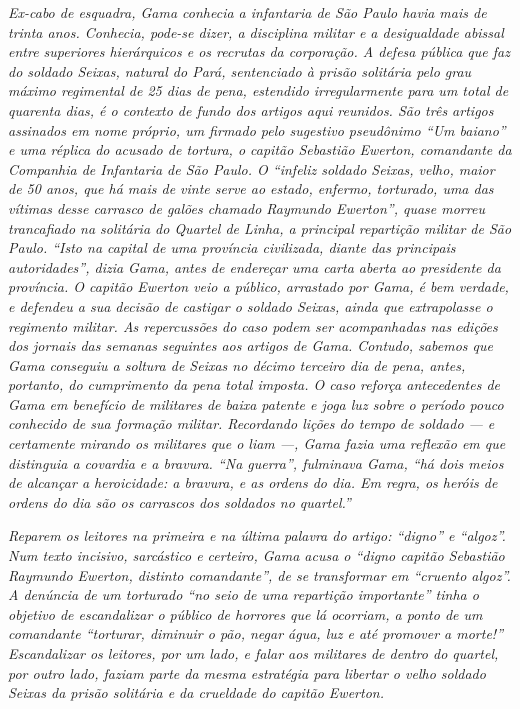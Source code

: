 \begin{didas}
\emph{Ex-cabo de esquadra, Gama conhecia a infantaria de São Paulo havia
mais de trinta anos. Conhecia, pode-se dizer, a disciplina militar e a
desigualdade abissal entre superiores hierárquicos e os recrutas da
corporação. A defesa pública que faz do soldado Seixas, natural do Pará,
sentenciado à prisão solitária pelo grau máximo regimental de 25 dias de
pena, estendido irregularmente para um total de quarenta dias, é o
contexto de fundo dos artigos aqui reunidos. São três artigos assinados
em nome próprio, um firmado pelo sugestivo pseudônimo ``Um baiano'' e uma
réplica do acusado de tortura, o capitão Sebastião Ewerton, comandante
da Companhia de Infantaria de São Paulo. O ``infeliz soldado Seixas,
velho, maior de 50 anos, que há mais de vinte serve ao estado, enfermo,
torturado, uma das vítimas desse carrasco de galões chamado Raymundo
Ewerton'', quase morreu trancafiado na solitária do Quartel de Linha, a
principal repartição militar de São Paulo. ``Isto na capital de uma
província civilizada, diante das principais autoridades'', dizia Gama,
antes de endereçar uma carta aberta ao presidente da província. O
capitão Ewerton veio a público, arrastado por Gama, é bem verdade, e
defendeu a sua decisão de castigar o soldado Seixas, ainda que
extrapolasse o regimento militar. As repercussões do caso podem ser
acompanhadas nas edições dos jornais das semanas seguintes aos artigos
de Gama. Contudo, sabemos que Gama conseguiu a soltura de Seixas no
décimo terceiro dia de pena, antes, portanto, do cumprimento da pena
total imposta. O caso reforça antecedentes de Gama em benefício de
militares de baixa patente e joga luz sobre o período pouco conhecido de
sua formação militar. Recordando lições do tempo de soldado --- e
certamente mirando os militares que o liam ---, Gama fazia uma reflexão
em que distinguia a covardia e a bravura. ``Na guerra'', fulminava Gama,
``há dois meios de alcançar a heroicidade: a bravura, e as ordens do dia.
Em regra, os heróis de ordens do dia são os carrascos dos soldados no
quartel.''}
\end{didas}



\begin{resumo}
\emph{Reparem os leitores na primeira e na última palavra do artigo:
``digno'' e ``algoz''. Num texto incisivo, sarcástico e certeiro, Gama acusa
o ``digno capitão Sebastião Raymundo Ewerton, distinto comandante'', de se
transformar em ``cruento algoz''. A denúncia de um torturado ``no seio de
uma repartição importante'' tinha o objetivo de escandalizar o público de
horrores que lá ocorriam, a ponto de um comandante ``torturar, diminuir o
pão, negar água, luz e até promover a morte!'' Escandalizar os leitores,
por um lado, e falar aos militares de dentro do quartel, por outro lado,
faziam parte da mesma estratégia para libertar o velho soldado Seixas da
prisão solitária e da crueldade do capitão Ewerton. }
\end{resumo}

